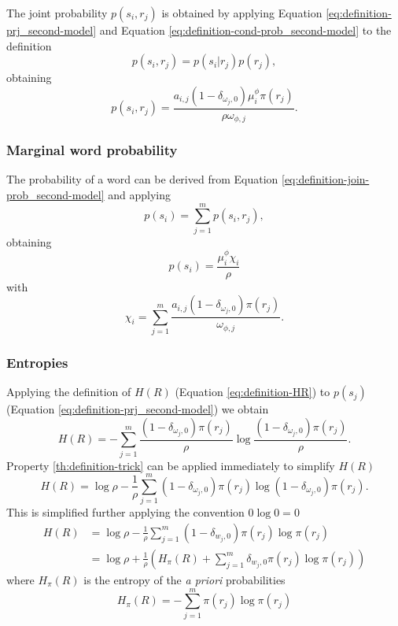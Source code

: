The joint probability $p(s_i, r_j)$ is obtained by applying Equation \eqref{eq:definition-prj_second-model} and Equation \eqref{eq:definition-cond-prob_second-model} to the definition
\begin{equation*}
  p(s_i, r_j) = p(s_i | r_j) p(r_j),
\end{equation*}
obtaining
\begin{equation}
  \label{eq:definition-join-prob_second-model}
  p(s_i, r_j) = \frac{a_{i,j} (1 - \delta_{\omega_j,0}) \mu_i^\phi \pi(r_j)}{\rho \omega_{\phi,j}}.
\end{equation}

\subsubsection{Marginal word probability}

The probability of a word can be derived from Equation \eqref{eq:definition-join-prob_second-model} and applying
\begin{equation*}
  p(s_i) = \sum_{j=1}^m p(s_i, r_j),
\end{equation*}
obtaining
\begin{equation}
  \label{eq:definition-psi_second-model}
  p(s_i) = \frac{\mu_i^\phi \chi_i}{\rho}
\end{equation}
with
\begin{equation}
  \label{eq:definition-chi_second-model}
  \chi_i = \sum_{j=1}^m \frac{a_{i,j} (1 - \delta_{\omega_j,0}) \pi(r_j)}{\omega_{\phi,j}}.
\end{equation}

\subsubsection{Entropies}

Applying the definition of $H(R)$ (Equation \eqref{eq:definition-HR}) to $p(s_j)$ (Equation \eqref{eq:definition-prj_second-model}) we obtain
\begin{equation*}
  H(R) = - \sum_{j=1}^m \frac{(1 - \delta_{\omega_j,0}) \pi(r_j)}{\rho} \log \frac{(1 - \delta_{\omega_j,0}) \pi(r_j)}{\rho}.
\end{equation*}
Property \ref{th:definition-trick} can be applied immediately to simplify $H(R)$
\begin{equation*}
  H(R) = \log \rho - \frac{1}{\rho} \sum_{j=1}^m (1 - \delta_{\omega_j,0}) \pi(r_j) \log (1-\delta_{\omega_j,0}) \pi(r_j).
\end{equation*}
This is simplified further applying the convention $0 \log 0 = 0$
\begin{align}
  \label{eq:definition-HR_second-model}
  H(R) &= \log \rho - \frac{1}{\rho} \sum_{j=1}^m (1 - \delta_{w_j,0}) \pi(r_j) \log \pi(r_j) \\  
       &= \log \rho + \frac{1}{\rho} \left( H_\pi(R) + \sum_{j=1}^m \delta_{w_j,0} \pi(r_j) \log \pi(r_j) \right) \nonumber
\end{align}
where $H_\pi(R)$ is the entropy of the \emph{a priori} probabilities
\begin{equation*}
  H_\pi(R) = -\sum_{j=1}^m \pi(r_j) \log \pi(r_j)
\end{equation*}

